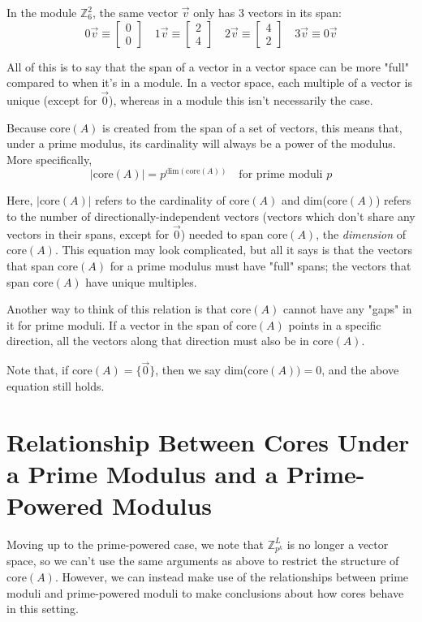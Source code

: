 \documentclass[a4paper, 12pt, reqno]{amsart}
\newcommand{\ssection}[1]{\vspace{1cm}\section{#1}}
\begin{document}
	In the module $\mathds{Z}_{6}^{2}$, the same vector $\vec{v}$ only has 3 vectors in its span:
	\[
		0\vec{v} \equiv
		\begin{bmatrix}
			0 \\
			0
		\end{bmatrix}
		\quad
		1\vec{v} \equiv
		\begin{bmatrix}
			2 \\
			4
		\end{bmatrix}
		\quad
		2\vec{v} \equiv
		\begin{bmatrix}
			4 \\
			2
		\end{bmatrix}
		\quad
		3\vec{v} \equiv 0\vec{v}
	\]
	
	All of this is to say that the span of a vector in a vector space can be more "full" compared to when it's in
	a module. In a vector space, each multiple of a vector is unique (except for $\vec{0}$), whereas in a module
	this isn't necessarily the case.
	
	Because core$(A)$ is created from the span of a set of vectors, this means that, under a prime modulus, its 
	cardinality will always be a power of the modulus. More specifically,
	\[
		|\text{core}(A)| = p^{\text{dim}(\text{core}(A))} \quad \text{for prime moduli} \,\, p 
	\]
	
	Here, $|\text{core}(A)|$ refers to the cardinality of core$(A)$ and dim(core$(A)$) refers to the number
	of directionally-independent vectors (vectors which don't share any vectors in their spans, except for $\vec{0}$) 
	needed to span core$(A)$, the \emph{dimension} of core$(A)$. This equation may look complicated, but all it 
	says is that the vectors that span core$(A)$ for a prime modulus must have "full" spans; the vectors that 
	span core$(A)$ have unique multiples.
	
	Another way to think of this relation is that core$(A)$ cannot have any "gaps" in it for prime moduli. If a
	vector in the span of core$(A)$ points in a specific direction, all the vectors along that direction must
	also be in core$(A)$.
	
	Note that, if core$(A) = \{\vec{0}\}$, then we say dim(core$(A)) = 0$, and the above equation still holds.
	
	\ssection{Relationship Between Cores Under a Prime Modulus and a Prime-Powered Modulus}
	Moving up to the prime-powered case, we note that $\mathds{Z}_{p^{k}}^{L}$ is no longer a vector space, so
	we can't use the same arguments as above to restrict the structure of core$(A)$. However, we can instead 
	make use of the relationships between prime moduli and prime-powered moduli to make conclusions about how 
	cores behave in this setting.
	
\end{document}
